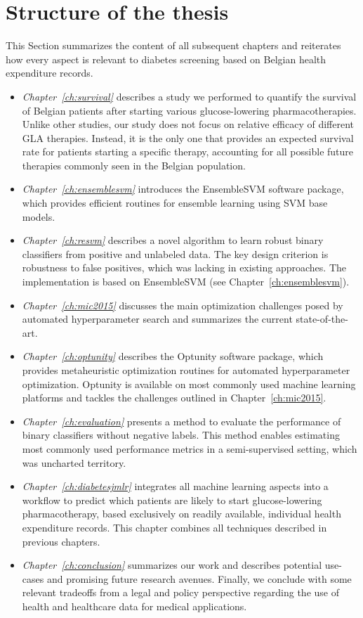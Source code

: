 \section{Structure of the thesis} \label{intro:structure}
This Section summarizes the content of all subsequent chapters  and reiterates how every aspect is relevant to diabetes screening based on Belgian health expenditure records.

\newcommand{\chapteritem}[2]{\item \emph{Chapter~\ref{ch:#1}} #2}
\begin{itemize}

\chapteritem{survival} describes a study we performed to quantify the survival of Belgian patients after starting various glucose-lowering pharmacotherapies. Unlike other studies, our study does not focus on relative efficacy of different GLA therapies. Instead, it is the only one that provides an expected survival rate for patients starting a specific therapy, accounting for all possible future therapies commonly seen in the Belgian population.

\chapteritem{ensemblesvm}{introduces the EnsembleSVM software package, which provides efficient routines for ensemble learning using SVM base models.}

\chapteritem{resvm}{describes a novel algorithm to learn robust binary classifiers from positive and unlabeled data. The key design criterion is robustness to false positives, which was lacking in existing approaches. The implementation is based on EnsembleSVM (see Chapter~\ref{ch:ensemblesvm}).}

\chapteritem{mic2015}{discusses the main optimization challenges posed by automated hyperparameter search and summarizes the current state-of-the-art.}

\chapteritem{optunity}{describes the Optunity software package, which provides metaheuristic optimization routines for automated hyperparameter optimization. Optunity is available on most commonly used machine learning platforms and tackles the challenges outlined in Chapter~\ref{ch:mic2015}.}

\chapteritem{evaluation}{presents a method to evaluate the performance of binary classifiers without negative labels. This method enables estimating most commonly used performance metrics in a semi-supervised setting, which was uncharted territory.}

\chapteritem{diabetesjmlr}{integrates all machine learning aspects into a workflow to predict which patients are likely to start glucose-lowering pharmacotherapy, based exclusively on readily available, individual health expenditure records. This chapter combines all techniques described in previous chapters.}

\chapteritem{conclusion}{summarizes our work and describes potential use-cases and promising future research avenues. Finally, we conclude with some relevant tradeoffs from a legal and policy perspective regarding the use of health and healthcare data for medical applications.}

\end{itemize}

